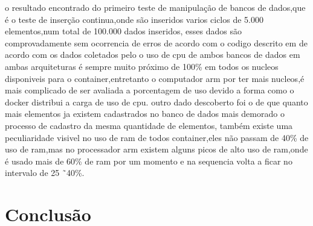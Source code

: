 \documentclass[
	12pt,				%
	openright,			%
	oneside,			%
	a4paper,			%
	english,			%
	french,				%
	spanish,			%
	brazil,				%
	]{abntex2}
\begin{document}


o resultado encontrado do primeiro teste de manipulação de bancos de dados,que é o teste de inserção continua,onde são inseridos varios ciclos de 5.000 elementos,num total de 100.000 dados inseridos,
esses dados são comprovadamente sem ocorrencia de erros de acordo com o codigo descrito em  de acordo com os dados coletados pelo  o uso de cpu de ambos bancos de dados em ambas arquiteturas é sempre muito próximo de 100\%
em todos os nucleos disponiveis para o container,entretanto o computador arm por ter mais nucleos,é mais complicado de ser avaliada a porcentagem de uso devido a forma como o docker distribui a carga de uso de cpu.
outro dado descoberto foi o de que quanto mais elementos ja existem cadastrados no banco de dados mais demorado o processo de cadastro da mesma quantidade de elementos,
também existe uma peculiaridade visivel no uso de ram de todos container,eles não passam de 40\% de uso de ram,mas no processador arm existem alguns picos de alto uso de ram,onde é usado mais de 60\% de ram por um momento e na sequencia volta a ficar no intervalo de 25 \~\  40\%.



 \chapter{Conclusão}
 \label{ch: conclusao}
 



% 

\postextual
\end{document}
